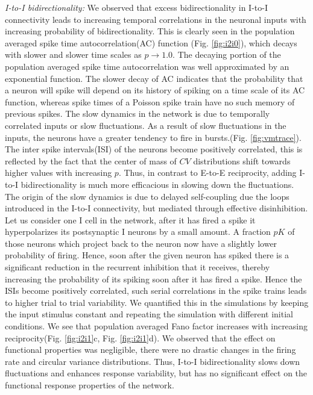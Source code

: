 \emph{I-to-I bidirectionality:} We observed that excess bidirectionality in I-to-I connectivity leads to increasing temporal correlations in the neuronal inputs with increasing probability of bidirectionality. This is clearly seen in the population averaged spike time autocorrelation(AC) function (Fig. \ref{fig:i2i0}), which decays with slower and slower time scales as $p \rightarrow 1.0$. The decaying portion of the population averaged spike time autocorrelation was well approximated by an exponential function. The slower decay of AC indicates that the probability that a neuron will spike will depend on its history of spiking on a time scale of its AC function, whereas spike times of a Poisson spike train have no such memory of previous spikes. The slow dynamics in the network is due to temporally correlated inputs or slow fluctuations. As a result of slow fluctuations in the inputs, the neurons have a greater tendency to fire in bursts.(Fig. \ref{fig:vmtrace}). The inter spike intervals(ISI) of the neurons become positively correlated, this is reflected by the fact that the center of mass of $CV$ distributions shift towards higher values with increasing $p$. Thus, in contrast to E-to-E reciprocity, adding I-to-I bidirectionality is much more efficacious in slowing down the fluctuations. The origin of the slow dynamics is due to delayed self-coupling due the loops introduced in the I-to-I connectivity, but mediated through effective disinhibition. Let us consider one I cell in the network, after it has fired a spike it hyperpolarizes its postsynaptic I neurons by a small amount. A fraction $pK$ of those neurons which project back to the neuron now have a slightly lower probability of firing. Hence, soon after the given neuron has spiked there is a significant reduction in the recurrent inhibition that it receives, thereby increasing the probability of its spiking soon after it has fired a spike. Hence the ISIs become positively correlated, such serial correlations in the spike trains leads to higher trial to trial variability. We quantified this in the simulations by keeping the input stimulus constant and repeating the simulation with different initial conditions. We see that population averaged Fano factor increases with increasing reciprocity(Fig. \ref{fig:i2i1}c, Fig. \ref{fig:i2i1}d). We observed that the effect on functional properties was negligible, there were no drastic changes in the firing rate and circular variance distributions. Thus, I-to-I bidirectionality slows down fluctuations and enhances response variability, but has no significant effect on the functional response properties of the network.

